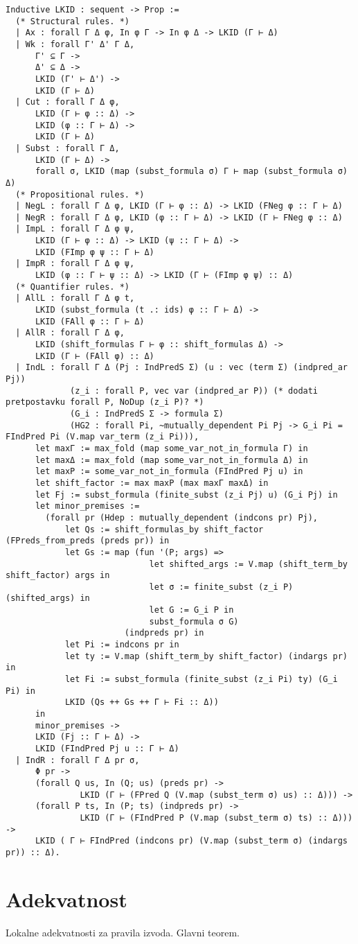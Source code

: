 \begin{verbatim}
Inductive LKID : sequent -> Prop := 
  (* Structural rules. *)
  | Ax : forall Γ Δ φ, In φ Γ -> In φ Δ -> LKID (Γ ⊢ Δ)
  | Wk : forall Γ' Δ' Γ Δ,
      Γ' ⊆ Γ ->
      Δ' ⊆ Δ ->
      LKID (Γ' ⊢ Δ') ->
      LKID (Γ ⊢ Δ)
  | Cut : forall Γ Δ φ,
      LKID (Γ ⊢ φ :: Δ) ->
      LKID (φ :: Γ ⊢ Δ) ->
      LKID (Γ ⊢ Δ)
  | Subst : forall Γ Δ,
      LKID (Γ ⊢ Δ) ->
      forall σ, LKID (map (subst_formula σ) Γ ⊢ map (subst_formula σ) Δ)
  (* Propositional rules. *)
  | NegL : forall Γ Δ φ, LKID (Γ ⊢ φ :: Δ) -> LKID (FNeg φ :: Γ ⊢ Δ)
  | NegR : forall Γ Δ φ, LKID (φ :: Γ ⊢ Δ) -> LKID (Γ ⊢ FNeg φ :: Δ)
  | ImpL : forall Γ Δ φ ψ,
      LKID (Γ ⊢ φ :: Δ) -> LKID (ψ :: Γ ⊢ Δ) ->
      LKID (FImp φ ψ :: Γ ⊢ Δ)
  | ImpR : forall Γ Δ φ ψ,
      LKID (φ :: Γ ⊢ ψ :: Δ) -> LKID (Γ ⊢ (FImp φ ψ) :: Δ)
  (* Quantifier rules. *)
  | AllL : forall Γ Δ φ t,
      LKID (subst_formula (t .: ids) φ :: Γ ⊢ Δ) -> 
      LKID (FAll φ :: Γ ⊢ Δ)
  | AllR : forall Γ Δ φ,
      LKID (shift_formulas Γ ⊢ φ :: shift_formulas Δ) ->
      LKID (Γ ⊢ (FAll φ) :: Δ)
  | IndL : forall Γ Δ (Pj : IndPredS Σ) (u : vec (term Σ) (indpred_ar Pj))
             (z_i : forall P, vec var (indpred_ar P)) (* dodati pretpostavku forall P, NoDup (z_i P)? *)
             (G_i : IndPredS Σ -> formula Σ)
             (HG2 : forall Pi, ~mutually_dependent Pi Pj -> G_i Pi = FIndPred Pi (V.map var_term (z_i Pi))),
      let maxΓ := max_fold (map some_var_not_in_formula Γ) in
      let maxΔ := max_fold (map some_var_not_in_formula Δ) in
      let maxP := some_var_not_in_formula (FIndPred Pj u) in
      let shift_factor := max maxP (max maxΓ maxΔ) in
      let Fj := subst_formula (finite_subst (z_i Pj) u) (G_i Pj) in
      let minor_premises :=
        (forall pr (Hdep : mutually_dependent (indcons pr) Pj),
            let Qs := shift_formulas_by shift_factor (FPreds_from_preds (preds pr)) in
            let Gs := map (fun '(P; args) =>
                             let shifted_args := V.map (shift_term_by shift_factor) args in
                             let σ := finite_subst (z_i P) (shifted_args) in
                             let G := G_i P in
                             subst_formula σ G)
                        (indpreds pr) in
            let Pi := indcons pr in
            let ty := V.map (shift_term_by shift_factor) (indargs pr) in
            let Fi := subst_formula (finite_subst (z_i Pi) ty) (G_i Pi) in
            LKID (Qs ++ Gs ++ Γ ⊢ Fi :: Δ))
      in
      minor_premises ->
      LKID (Fj :: Γ ⊢ Δ) ->
      LKID (FIndPred Pj u :: Γ ⊢ Δ)
  | IndR : forall Γ Δ pr σ,
      Φ pr ->
      (forall Q us, In (Q; us) (preds pr) ->
               LKID (Γ ⊢ (FPred Q (V.map (subst_term σ) us) :: Δ))) ->
      (forall P ts, In (P; ts) (indpreds pr) ->
               LKID (Γ ⊢ (FIndPred P (V.map (subst_term σ) ts) :: Δ))) ->
      LKID ( Γ ⊢ FIndPred (indcons pr) (V.map (subst_term σ) (indargs pr)) :: Δ).
\end{verbatim}
\section{Adekvatnost}\label{sec:adekvatnost}
Lokalne adekvatnosti za pravila izvoda. Glavni teorem.


